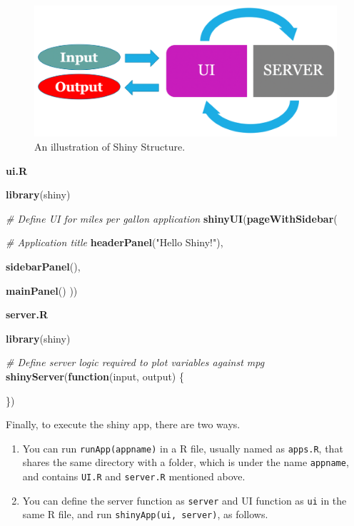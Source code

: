 \documentclass[]{book}
\newenvironment{Shaded}{\begin{snugshade}}{\end{snugshade}}
\newcommand{\KeywordTok}[1]{\textcolor[rgb]{0.13,0.29,0.53}{\textbf{#1}}}
\newcommand{\StringTok}[1]{\textcolor[rgb]{0.31,0.60,0.02}{#1}}
\newcommand{\CommentTok}[1]{\textcolor[rgb]{0.56,0.35,0.01}{\textit{#1}}}
\newcommand{\ControlFlowTok}[1]{\textcolor[rgb]{0.13,0.29,0.53}{\textbf{#1}}}
\newcommand{\NormalTok}[1]{#1}
\begin{document}
\begin{figure}

{\centering \includegraphics[width=0.5\linewidth]{figures/shiny} 

}

\caption{An illustration of Shiny Structure.}\label{fig:shiny1}
\end{figure}

\textbf{ui.R}

\begin{Shaded}
\begin{Highlighting}[]
\KeywordTok{library}\NormalTok{(shiny)}

\CommentTok{# Define UI for miles per gallon application}
\KeywordTok{shinyUI}\NormalTok{(}\KeywordTok{pageWithSidebar}\NormalTok{(}

  \CommentTok{# Application title}
  \KeywordTok{headerPanel}\NormalTok{(}\StringTok{"Hello Shiny!"}\NormalTok{),}

  \KeywordTok{sidebarPanel}\NormalTok{(),}

  \KeywordTok{mainPanel}\NormalTok{()}
\NormalTok{))}
\end{Highlighting}
\end{Shaded}

\textbf{server.R}

\begin{Shaded}
\begin{Highlighting}[]
\KeywordTok{library}\NormalTok{(shiny)}

\CommentTok{# Define server logic required to plot variables against mpg}
\KeywordTok{shinyServer}\NormalTok{(}\ControlFlowTok{function}\NormalTok{(input, output) \{}

\NormalTok{\})}
\end{Highlighting}
\end{Shaded}

Finally, to execute the shiny app, there are two ways.

\begin{enumerate}
\def\labelenumi{\arabic{enumi}.}
\item
  You can run
  \texttt{runApp(\textquotesingle{}appname\textquotesingle{})} in a R
  file, usually named as \texttt{apps.R}, that shares the same directory
  with a folder, which is under the name
  \texttt{\textquotesingle{}appname\textquotesingle{}}, and contains
  \texttt{UI.R} and \texttt{server.R} mentioned above.
\item
  You can define the server function as \texttt{server} and UI function
  as \texttt{ui} in the same R file, and run
  \texttt{shinyApp(ui,\ server)}, as follows.
\end{enumerate}
\end{document}
